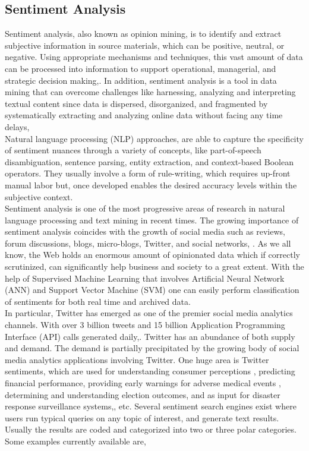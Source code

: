 \subsection{Sentiment Analysis}
Sentiment analysis, also known as opinion mining, is to identify and extract subjective information in source materials, which can be positive, neutral, or negative. Using appropriate mechanisms and techniques, this vast amount of data can be processed into information to support operational, managerial, and strategic decision making,\cite{ref6}. In addition, sentiment analysis is a tool in data mining that can overcome challenges like harnessing, analyzing and interpreting textual content since data is dispersed, disorganized, and fragmented by systematically extracting and analyzing online data without facing any time delays,\cite{ref7}
\leavevmode\\

Natural language processing (NLP) approaches, are able to capture the specificity of sentiment nuances through a variety of concepts, like part-of-speech disambiguation, sentence parsing, entity extraction, and context-based Boolean operators. They usually involve a form of rule-writing, which requires up-front manual labor but, once developed enables the desired accuracy levels within the subjective context.
\leavevmode\\

Sentiment analysis is one of the most progressive areas of research in natural language processing and text mining in recent times. The growing importance of sentiment analysis coincides with the growth of social media such as reviews, forum discussions, blogs, micro-blogs, Twitter, and social networks, \cite{ref20}. As we all know, the Web holds an enormous amount of opinionated data which if correctly scrutinized, can significantly help business and society to a great extent. With the help of Supervised Machine Learning that involves Artificial Neural Network (ANN) and Support Vector Machine (SVM) one can easily perform classification of sentiments for both real time and archived data.
\leavevmode\\

In particular, Twitter has emerged as one of the premier social media analytics channels. With over 3 billion tweets and 15 billion Application Programming Interface (API) calls generated daily,\cite{ref8}. Twitter has an abundance of both supply and demand. The demand is partially precipitated by the growing body of social media analytics applications involving Twitter. One huge area is Twitter sentiments, which are used for understanding consumer perceptions \cite{ref11}, predicting financial performance\cite{ref9}, providing early warnings for adverse medical events \cite{ref10}, determining and understanding election outcomes\cite{12}, and as input for disaster response surveillance systems,\cite{ref13}, etc. Several sentiment search engines exist where users run typical queries on any topic of interest, and generate text results. Usually the results are coded and categorized into two or three polar categories. Some examples currently available are,\cite{ref14}


